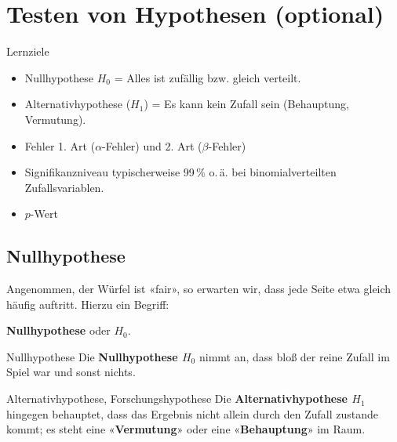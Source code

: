 
\section{Testen von Hypothesen (optional)}


Lernziele

\begin{itemize}
\item Nullhypothese $H_0$ = Alles ist zufällig bzw. gleich verteilt.

\item Alternativhypothese ($H_1$) = Es kann kein Zufall sein
  (Behauptung, Vermutung). 

\item Fehler 1. Art ($\alpha$-Fehler) und 2. Art ($\beta$-Fehler)
  
\item Signifikanzniveau typischerweise 99\,\%
  o.\,ä. bei binomialverteilten Zufallsvariablen.

\item $p$-Wert
  
\end{itemize}

\newpage

\subsection{Nullhypothese}
Angenommen, der Würfel ist «fair», so erwarten wir, dass jede Seite
etwa gleich häufig auftritt. Hierzu ein Begriff:

\begin{center}\textbf{Nullhypothese} oder {$H_0$}.\end{center}

\begin{definition}{Nullhypothese}{}
Die \textbf{Nullhypothese $H_0$} nimmt an, dass bloß der reine Zufall
im Spiel war und sonst nichts.
\end{definition}

\begin{definition}{Alternativhypothese, Forschungshypothese}{}
Die \textbf{Alternativhypothese $H_1$} hingegen behauptet, dass das
Ergebnis nicht allein durch den Zufall zustande kommt; es steht eine
«\textbf{Vermutung}» oder eine «\textbf{Behauptung}» im Raum. 
\end{definition}



